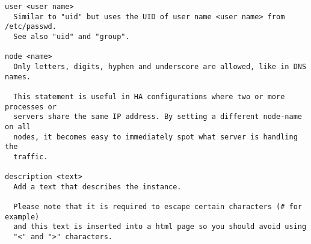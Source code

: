 \begin{verbatim}
user <user name>
  Similar to "uid" but uses the UID of user name <user name> from /etc/passwd.
  See also "uid" and "group".

node <name>
  Only letters, digits, hyphen and underscore are allowed, like in DNS names.

  This statement is useful in HA configurations where two or more processes or
  servers share the same IP address. By setting a different node-name on all
  nodes, it becomes easy to immediately spot what server is handling the
  traffic.

description <text>
  Add a text that describes the instance.

  Please note that it is required to escape certain characters (# for example)
  and this text is inserted into a html page so you should avoid using
  "<" and ">" characters.


\end{verbatim}

